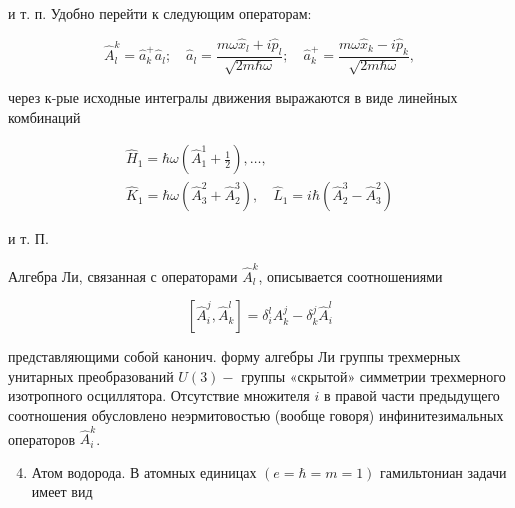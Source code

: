 \documentclass[10pt]{article}
\begin{document}
и т. п. Удобно перейти к следующим операторам:



\[

\hat{A}_{l}^{k}=\hat{a}_{k}^{+} \hat{a}_{l} ; \quad \hat{a}_{l}=\frac{m \omega \hat{x}_{l}+i \hat{p}_{l}}{\sqrt{2 m \hbar \omega}} ; \quad \hat{a}_{k}^{+}=\frac{m \omega \hat{x}_{k}-i \hat{p}_{k}}{\sqrt{2 m \hbar \omega}},

\]



через к-рые исходные интегралы движения выражаются в виде линейных комбинаций



\[

\begin{gathered}

\hat{H}_{1}=\hbar \omega\left(\hat{A}_{1}^{1}+\frac{1}{2}\right), \ldots, \\

\hat{K}_{1}=\hbar \omega\left(\hat{A}_{3}^{2}+\hat{A}_{2}^{3}\right), \quad \hat{L}_{1}=i \hbar\left(\hat{A}_{2}^{3}-\hat{A}_{3}^{2}\right)

\end{gathered}

\]



и т. П.



Алгебра Ли, связанная с операторами $\hat{A}_{l}^{k}$, описывается соотношениями



\[

\left[\hat{A}_{i}^{j}, \hat{A}_{k}^{l}\right]=\delta_{i}^{l} A_{k}^{j}-\delta_{k}^{j} \hat{A}_{i}^{l}

\]



представляющими собой канонич. форму алгебры Ли группы трехмерных унитарных преобразований $U(3)-$ группы «скрытой» симметрии трехмерного изотропного осциллятора. Отсутствие множителя $i$ в правой части предыдущего соотношения обусловлено неэрмитовостью (вообще говоря) инфинитезимальных операторов $\hat{A}_{i}^{k}$.



\begin{enumerate}

  \setcounter{enumi}{3}

  \item Атом водорода. В атомных единицах $(e=\hbar=m=1)$ гамильтониан задачи имеет вид

\end{enumerate}
\end{document}
